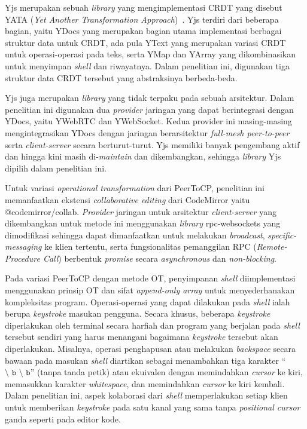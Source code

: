 Yjs merupakan sebuah \textit{library} yang mengimplementasi CRDT yang disebut YATA (\textit{Yet Another Transformation Approach})~\citep{Nicolaescu2016yjs}. Yjs terdiri dari beberapa bagian, yaitu YDocs yang merupakan bagian utama implementasi berbagai struktur data untuk CRDT, ada pula YText yang merupakan variasi CRDT untuk operasi-operasi pada teks, serta YMap dan YArray yang dikombinasikan untuk menyimpan \textit{shell} dan riwayatnya. Dalam penelitian ini, digunakan tiga struktur data CRDT tersebut yang abstraksinya berbeda-beda.

Yjs juga merupakan \textit{library} yang tidak terpaku pada sebuah arsitektur. Dalam penelitian ini digunakan dua \textit{provider} jaringan yang dapat berintegrasi dengan YDocs, yaitu YWebRTC dan YWebSocket. Kedua provider ini masing-masing mengintegrasikan YDocs dengan jaringan berarsitektur \textit{full-mesh peer-to-peer} serta \textit{client-server} secara berturut-turut. Yjs memiliki banyak pengembang aktif dan hingga kini masih di-\textit{maintain} dan dikembangkan, sehingga \textit{library} Yjs dipilih dalam penelitian ini.

Untuk variasi \textit{operational transformation} dari PeerToCP, penelitian ini memanfaatkan ekstensi \textit{collaborative editing} dari CodeMirror yaitu @codemirror/collab. \textit{Provider} jaringan untuk arsitektur \textit{client-server} yang dikembangkan untuk metode ini menggunakan \textit{library} rpc-websockets yang dimodifikasi sehingga dapat dimanfaatkan untuk melakukan \textit{broadcast}, \textit{specific-messaging} ke klien tertentu, serta fungsionalitas pemanggilan RPC (\textit{Remote-Procedure Call}) berbentuk \textit{promise} secara \textit{asynchronous} dan \textit{non-blocking}.

Pada variasi PeerToCP dengan metode OT, penyimpanan \textit{shell} diimplementasi menggunakan prinsip OT dan sifat \textit{append-only array} untuk menyederhanakan kompleksitas program. Operasi-operasi yang dapat dilakukan pada \textit{shell} ialah berupa \textit{keystroke} masukan pengguna. Secara khusus, beberapa \textit{keystroke} diperlakukan oleh terminal secara harfiah dan program yang berjalan pada \textit{shell} tersebut sendiri yang harus menangani bagaimana \textit{keystroke} tersebut akan diperlakukan. Misalnya, operasi penghapusan atau melakukan \textit{backspace} secara bawaan pada masukan \textit{shell} diartikan sebagai menambahkan tiga karakter ``$\texttt{\char`\\ b \char`\\ b}$'' (tanpa tanda petik) atau ekuivalen dengan memindahkan \textit{cursor} ke kiri, memasukkan karakter \textit{whitespace}, dan memindahkan \textit{cursor} ke kiri kembali. Dalam penelitian ini, aspek kolaborasi dari \textit{shell} memperlakukan setiap klien untuk memberikan \textit{keystroke} pada satu kanal yang sama tanpa \textit{positional cursor} ganda seperti pada editor kode.

